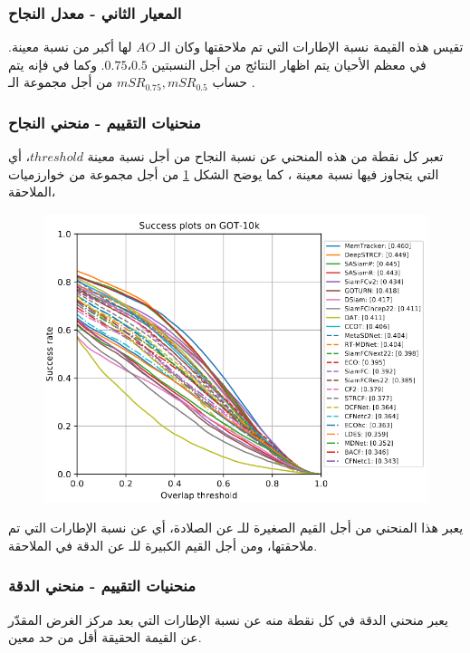 \subsubsection{المعيار الثاني - معدل النجاح
}
تقيس هذه القيمة نسبة الإطارات التي تم ملاحقتها وكان الـ
$AO$
لها
أكبر من نسبة معينة.
في معظم الأحيان يتم اظهار النتائج من أجل النسبتين 
$0.75،0.5$.
وكما في 
فإنه يتم حساب 
$mSR_{0.75},mSR_{0.5}$
من أجل مجموعة الـ
.
\subsubsection{منحنيات التقييم - منحني النجاح 
}
تعبر كل نقطة من هذه المنحني عن نسبة النجاح من أجل نسبة معينة
$threshold$،
أي التي يتجاوز فيها 
نسبة معينة
،
كما يوضح الشكل
\ref{fig:got10k_SuccessCurve}
من أجل مجموعة من خوارزميات الملاحقة،
\begin{figure}[!h]
	\centerline{\includegraphics[width=\textwidth]{images/got10k_SuccessCurve}}
	\caption{
		}
	\label{fig:got10k_SuccessCurve}
\end{figure}
يعبر هذا المنحني من أجل القيم الصغيرة للـ
عن الصلادة، أي عن نسبة الإطارات التي تم ملاحقتها، ومن أجل القيم الكبيرة للـ
عن الدقة في الملاحقة.
\subsubsection{منحنيات التقييم - منحني الدقة 
	}
يعبر منحني الدقة في كل نقطة منه عن نسبة الإطارات التي بعد مركز الغرض المقدّر عن القيمة الحقيقة أقل من حد معين.
